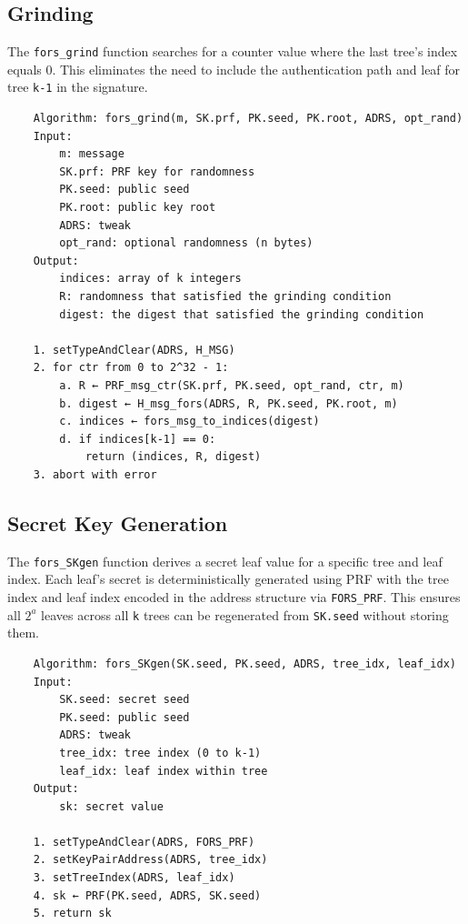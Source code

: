 \subsection{Grinding}
The \texttt{fors\_grind} function searches for a counter value where the last tree's index equals 0. This eliminates the need to include the authentication path and leaf for tree \texttt{k-1} in the signature.
\begin{verbatim}
    Algorithm: fors_grind(m, SK.prf, PK.seed, PK.root, ADRS, opt_rand)
    Input:
        m: message
        SK.prf: PRF key for randomness
        PK.seed: public seed
        PK.root: public key root
        ADRS: tweak
        opt_rand: optional randomness (n bytes)
    Output:
        indices: array of k integers
        R: randomness that satisfied the grinding condition
        digest: the digest that satisfied the grinding condition

    1. setTypeAndClear(ADRS, H_MSG)
    2. for ctr from 0 to 2^32 - 1:
        a. R ← PRF_msg_ctr(SK.prf, PK.seed, opt_rand, ctr, m)
        b. digest ← H_msg_fors(ADRS, R, PK.seed, PK.root, m)
        c. indices ← fors_msg_to_indices(digest)
        d. if indices[k-1] == 0:
            return (indices, R, digest)
    3. abort with error
\end{verbatim}

\subsection{Secret Key Generation}
The \texttt{fors\_SKgen} function derives a secret leaf value for a specific tree and leaf index. Each leaf's secret is deterministically generated using PRF with the tree index and leaf index encoded in the address structure via \texttt{FORS\_PRF}. This ensures all $2^a$ leaves across all \texttt{k} trees can be regenerated from \texttt{SK.seed} without storing them.
\begin{verbatim}
    Algorithm: fors_SKgen(SK.seed, PK.seed, ADRS, tree_idx, leaf_idx)
    Input:
        SK.seed: secret seed
        PK.seed: public seed
        ADRS: tweak
        tree_idx: tree index (0 to k-1)
        leaf_idx: leaf index within tree
    Output:
        sk: secret value

    1. setTypeAndClear(ADRS, FORS_PRF)
    2. setKeyPairAddress(ADRS, tree_idx)
    3. setTreeIndex(ADRS, leaf_idx)
    4. sk ← PRF(PK.seed, ADRS, SK.seed)
    5. return sk
\end{verbatim}

